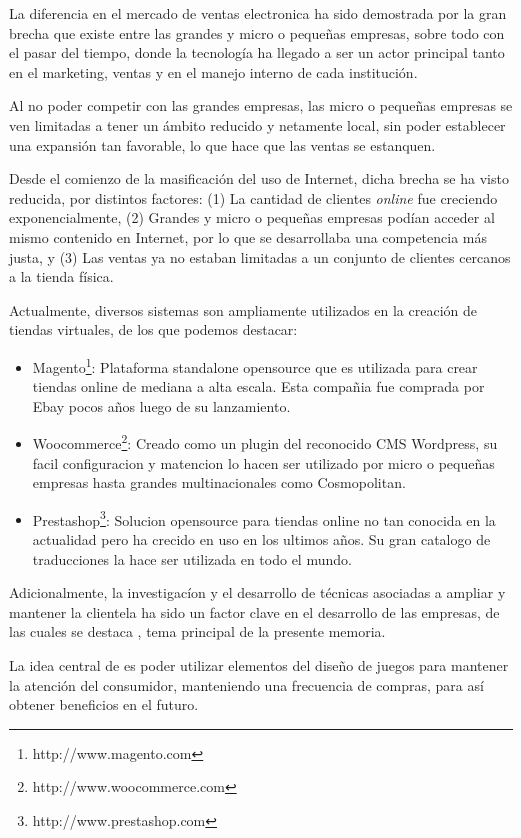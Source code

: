 La diferencia en el mercado de ventas electronica ha sido demostrada por la gran
brecha que existe entre las grandes y micro o pequeñas empresas, sobre todo con el
pasar del tiempo, donde la tecnología ha llegado a ser un actor principal
tanto en el marketing, ventas y en el manejo interno de cada institución.

Al no poder competir con las grandes empresas, las micro o pequeñas empresas se ven
limitadas a tener un ámbito reducido y netamente local, sin poder establecer
una expansión tan favorable, lo que hace que las ventas se estanquen.

Desde el comienzo de la masificación del uso de Internet, dicha brecha se ha
visto reducida, por distintos factores: (1) La cantidad de clientes \emph{online}
fue creciendo exponencialmente, (2) Grandes y micro o pequeñas empresas podían acceder
al mismo contenido en Internet, por lo que se desarrollaba una competencia
más justa, y (3) Las ventas ya no estaban limitadas a un conjunto de clientes
cercanos a la tienda física.

Actualmente, diversos sistemas son ampliamente utilizados en la creación
de tiendas virtuales, de los que podemos destacar:
\begin{itemize}

\item Magento\footnote{http://www.magento.com}: Plataforma standalone opensource que es utilizada
 para crear tiendas online de mediana a alta escala. Esta compañia fue comprada por Ebay pocos años 
luego de su lanzamiento.
\item Woocommerce\footnote{http://www.woocommerce.com}: Creado como un plugin del reconocido CMS Wordpress, su facil
configuracion y matencion lo hacen ser utilizado por micro o pequeñas empresas hasta grandes multinacionales 
como Cosmopolitan.
\item Prestashop\footnote{http://www.prestashop.com}: Solucion opensource para tiendas online no tan conocida en
la actualidad pero ha crecido en uso en los ultimos años. Su gran catalogo de traducciones la hace ser utilizada
en todo el mundo.

\end{itemize}  

Adicionalmente, la investigacíon y el desarrollo de técnicas asociadas a ampliar y mantener
la clientela ha sido un factor clave en el desarrollo de las empresas,
de las cuales se destaca {\GAM}, tema principal de la presente memoria.

La idea central de  {\GAM} es poder utilizar elementos del diseño de juegos
para mantener la atención del consumidor, manteniendo una frecuencia de compras,
para así obtener beneficios en el futuro.

